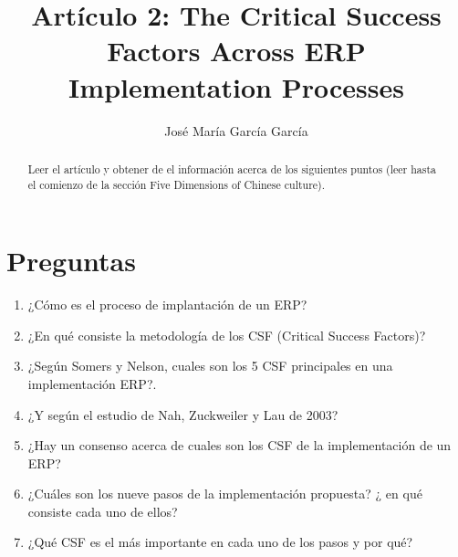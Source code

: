 \documentclass[11pt,a4paper]{article}
\author{José María García García}
\title{Artículo 2: The Critical Success Factors Across ERP Implementation Processes}
\begin{document}
\maketitle
\begin{abstract}
Leer el artículo y obtener de el información acerca de los siguientes puntos (leer hasta el comienzo de la sección Five Dimensions of Chinese culture).
\end{abstract}

\section{Preguntas}

\begin{enumerate}
\item ¿Cómo es el proceso de implantación de un ERP?
\item ¿En qué consiste la metodología de los CSF (Critical Success Factors)?
\item ¿Según Somers y Nelson, cuales son los 5 CSF principales en una implementación ERP?.
\item ¿Y según el estudio de Nah, Zuckweiler y Lau de 2003?
\item ¿Hay un consenso acerca de cuales son los CSF de la implementación de un ERP?
\item ¿Cuáles son los nueve pasos de la implementación propuesta? ¿ en qué consiste cada uno de ellos?
\item ¿Qué CSF es el más importante en cada uno de los pasos y por qué?
\end{enumerate}
\end{document}
